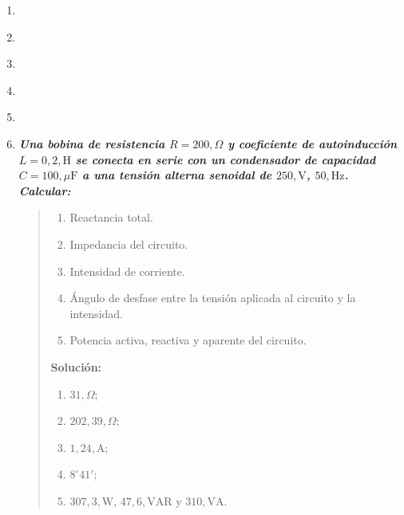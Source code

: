 \documentclass[spanish,openany]{report}
\begin{document}
\begin{enumerate}
\clearpage
	\item
		\begin{quote}
		\end{quote}
		
	\item
		\begin{quote}
		\end{quote}
		
	\item
		\begin{quote}
		\end{quote}
		
	\item
		\begin{quote}
		\end{quote}
		
	\item
		\begin{quote}
		\end{quote}
		
	\item\textbf{\textit{{Una bobina de resistencia $R = 200 , \Omega$ y coeficiente de autoinducción $L = 0,2 , \mathrm{H}$ se conecta en serie con un condensador de capacidad $C = 100 , \mu\mathrm{F}$ a una tensión alterna senoidal de $250 , \mathrm{V}$, $50 , \mathrm{Hz}$. Calcular:}}}
		\begin{quote}
		\begin{enumerate}[label=\alph*)]
				\item Reactancia total.
				\item Impedancia del circuito.
				\item Intensidad de corriente.
				\item Ángulo de desfase entre la tensión aplicada al circuito y la intensidad.
				\item Potencia activa, reactiva y aparente del circuito.
			\end{enumerate}
			\textbf{Solución:}
			\begin{enumerate}[label=\alph*)]
				\item $31 , \Omega$;
				\item $202,39 , \Omega$;
				\item $1,24 , \mathrm{A}$;
				\item $8^\circ 41'$;
				\item $307,3 , \mathrm{W}$, $47,6 , \mathrm{VAR}$ y $310 , \mathrm{VA}$.
			\end{enumerate}


\end{quote}
\end{enumerate}
\end{document}
